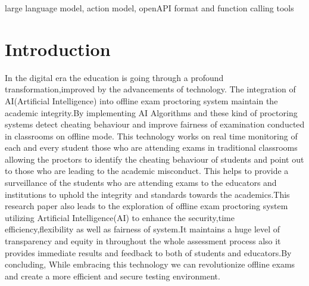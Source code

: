 \documentclass[conference]{IEEEtran}
\begin{document}
\begin{IEEEkeywords}
large language model, action model, openAPI format and function calling tools
\end{IEEEkeywords}

\section{Introduction}
In the digital era the education is going through a profound transformation,improved by the advancements of technology.
The integration of AI(Artificial Intelligence) into offline exam proctoring system maintain the academic integrity.By implementing AI Algorithms and these kind of proctoring systems detect cheating behaviour and improve fairness of examination conducted in classrooms on offline mode. This technology works on real time monitoring of each and every student those who are attending exams in traditional classrooms allowing the proctors to identify the cheating behaviour of students and point out to those who are leading to the academic misconduct.
This helps to provide a surveillance of the students who are attending exams to the educators and institutions to uphold the integrity and standards towards the academics.This research paper also leads to the exploration of offline exam proctoring system utilizing Artificial Intelligence(AI) to enhance the  security,time efficiency,flexibility as well as fairness of system.It maintains a huge level of transparency and equity in throughout the whole assessment process also it provides immediate results and feedback to both of students and educators.By concluding, While embracing this technology we can revolutionize offline exams and create a more efficient and secure testing environment.
\end{document}
